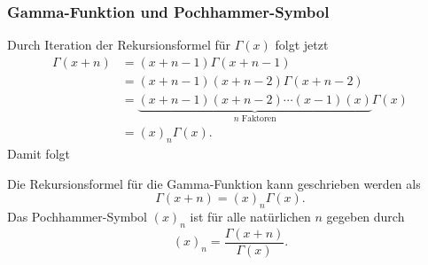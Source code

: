 %
%
\subsubsection{Gamma-Funktion und Pochhammer-Symbol}
Durch Iteration der Rekursionsformel für $\Gamma(x)$ folgt jetzt
\begin{align*}
\Gamma(x+n)
&=
(x+n-1) \Gamma(x+n-1)
\\
&=
(x+n-1)(x+n-2)\Gamma(x+n-2)
\\
&=
\underbrace{
(x+n-1)(x+n-2)\cdots(x-1)(x)
}_{\text{$n$ Faktoren}} \Gamma(x)
\\
&=(x)_n \Gamma(x).
\end{align*}
Damit folgt

\begin{satz}
%
\label{buch:rekursion:gamma:satz:gamma-pochhammer}
Die Rekursionsformel für die Gamma-Funktion kann geschrieben werden als
\[
\Gamma(x+n) = (x)_n \Gamma(x).
\]
Das Pochhammer-Symbol $(x)_n$ ist für alle natürlichen $n$ gegeben durch
\[
(x)_n = \frac{\Gamma(x+n)}{\Gamma(x)}.
\]
\end{satz}

%
%
